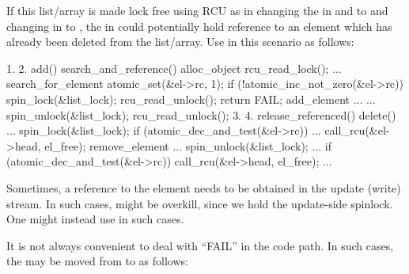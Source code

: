 If this list/array is made lock free using RCU as in changing the
 in  and  to  and changing 
in  to , the  in
 could potentially hold reference to an element which
has already been deleted from the list/array.
Use 
in this scenario as follows:

\vspace{2ex}
\begin{VerbatimU}[fontsize=\tiny,label={\small{CODE LISTING B}}]
    1.                                      2.
    add()                                   search_and_reference()
    {                                       {
        alloc_object                            rcu_read_lock();
        ...                                     search_for_element
        atomic_set(&el->rc, 1);                 if (!atomic_inc_not_zero(&el->rc)) {
        spin_lock(&list_lock);                      rcu_read_unlock();
        return FAIL;
        add_element                             }
        ...                                     ...
        spin_unlock(&list_lock);                rcu_read_unlock();
    }                                       }
    3.                                      4.
    release_referenced()                    delete()
    {                                       {
        ...                                     spin_lock(&list_lock);
        if (atomic_dec_and_test(&el->rc))       ...
            call_rcu(&el->head, el_free);       remove_element
            ...                                 spin_unlock(&list_lock);
    }                                           ...
                                                if (atomic_dec_and_test(&el->rc))
                                                    call_rcu(&el->head, el_free);
                                                ...
                                            }
\end{VerbatimU}

Sometimes, a reference to the element needs to be obtained in the
update (write) stream.
In such cases,  might be
overkill, since we hold the update-side spinlock.
One might instead
use  in such cases.

It is not always convenient to deal with ``FAIL'' in the
 code path.
In such cases, the
 may be moved from  to 
as follows:

